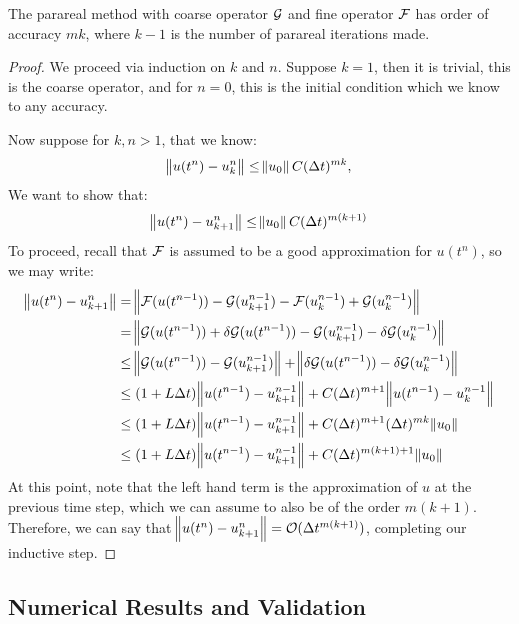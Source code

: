 \begin{theorem*}
  The parareal method with coarse operator $\mathcal{G}$ and fine operator $\mathcal{F}$
  has order of accuracy $mk$, where $k-1$ is the number of parareal iterations
  made. \cite{balarticle} \cite{fieldstalk}
\end{theorem*}
\begin{proof}
  We proceed via induction on $k$ and $n$. Suppose $k = 1$, then it is trivial,
  this is the coarse operator, and for $n = 0$, this is the initial condition
  which we know to any accuracy.

  Now suppose for $k,n > 1$, that we know:
  \[
    \norm{u(t^n) - u_k^n} \leq \norm{u_0}C(\Delta t)^{mk}, 
  \]
  We want to show that:
  \[
    \norm{u(t^n) - u_{k+1}^n} \leq \norm{u_0}C(\Delta t)^{m(k+1)}
  \]
  To proceed, recall that $\mathcal{F}$ is assumed to be a good approximation for
  $u(t^n)$, so we may write:
  \begin{align*}
    \norm{u(t^n) - u_{k+1}^n} & = \norm{\mathcal{F}(u(t^{n-1})) -
    \mathcal{G}(u^{n-1}_{k+1}) - \mathcal{F}(u^{n-1}_k) + \mathcal{G}(u^{n-1}_k)} \\
    & = \norm{\mathcal{G}(u(t^{n-1})) + \delta \mathcal{G} (u(t^{n-1}))  -
    \mathcal{G}(u^{n-1}_{k+1}) - \delta \mathcal{G}(u^{n-1}_k)} \\
    & \leq \norm{\mathcal{G}(u(t^{n-1})) - \mathcal{G}(u^{n-1}_{k+1})} + 
    \norm{ \delta \mathcal{G} (u(t^{n-1})) - \delta \mathcal{G}(u^{n-1}_k)} \\
    & \leq (1+L\Delta t)\norm{u(t^{n-1}) - u^{n-1}_{k+1}} + 
    C(\Delta t)^{m+1}\norm{ u(t^{n-1}) - u^{n-1}_k} \\
    & \leq (1+L\Delta t)\norm{u(t^{n-1}) - u^{n-1}_{k+1}} + 
    C(\Delta t)^{m+1}(\Delta t)^{mk}\norm{ u_0 } \\
    & \leq (1+L\Delta t)\norm{u(t^{n-1}) - u^{n-1}_{k+1}} + 
    C(\Delta t)^{m(k+1)+1}\norm{ u_0 } \\
  \end{align*}
  At this point, note that the left hand term is the approximation of $u$ at the
  previous time step, which we can assume to also be of the order $m(k+1)$.
  Therefore, we can say that $\norm{u(t^n) - u_{k+1}^n} = \mathcal{O}(\Delta
  t^{m(k+1)})$, completing our inductive step.
\end{proof}

\subsection{Numerical Results and Validation}

